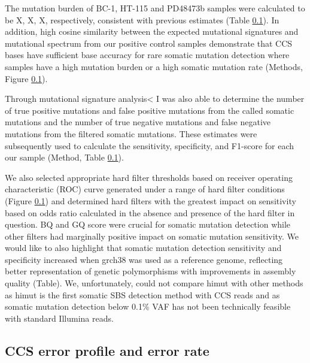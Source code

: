 The mutation burden of BC-1, HT-115 and PD48473b samples were calculated to be X, X, X, respectively, consistent with previous estimates \cite{Petljak2019-wi, Mitchell2022-ry} (Table \ref{}). In addition, high cosine similarity between the expected mutational signatures and mutational spectrum from our positive control samples demonstrate that CCS bases have sufficient base accuracy for rare somatic mutation detection where samples have a high mutation burden or a high somatic mutation rate (Methods, Figure \ref{}). 


Through mutational signature analysis< I was also able to determine the number of true positive mutations and false positive mutations from the called somatic mutations and the number of true negative mutations and false negative mutations from the filtered somatic mutations. These estimates were subsequently used to calculate the sensitivity, specificity, and F1-score for each our sample (Method, Table \ref{}).


We also selected appropriate hard filter thresholds based on receiver operating characteristic (ROC) curve generated under a range of hard filter conditions (Figure \ref{}) and determined hard filters with the greatest impact on sensitivity based on odds ratio calculated in the absence and presence of the hard filter in question. BQ and GQ score were crucial for somatic mutation detection while other filters had marginally positive impact on somatic mutation sensitivity. We would like to also highlight that somatic mutation detection sensitivity and specificity increased when grch38 was used as a reference genome, reflecting better representation of genetic polymorphisms with improvements in assembly quality (Table). We, unfortunately, could not compare himut with other methods as himut is the first somatic SBS detection method with CCS reads and as somatic mutation detection below 0.1\% VAF has not been technically feasible with standard Illumina reads. 


\subsection{CCS error profile and error rate}

